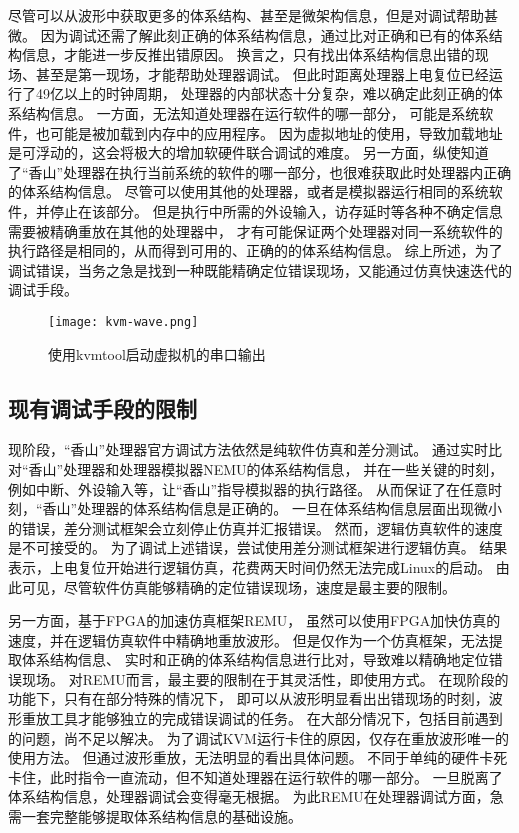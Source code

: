 尽管可以从波形中获取更多的体系结构、甚至是微架构信息，但是对调试帮助甚微。
因为调试还需了解此刻正确的体系结构信息，通过比对正确和已有的体系结构信息，才能进一步反推出错原因。
换言之，只有找出体系结构信息出错的现场、甚至是第一现场，才能帮助处理器调试。
但此时距离处理器上电复位已经运行了49亿以上的时钟周期，
处理器的内部状态十分复杂，难以确定此刻正确的体系结构信息。
一方面，无法知道处理器在运行软件的哪一部分，
可能是系统软件，也可能是被加载到内存中的应用程序。
因为虚拟地址的使用，导致加载地址是可浮动的，这会将极大的增加软硬件联合调试的难度。
另一方面，纵使知道了“香山”处理器在执行当前系统的软件的哪一部分，也很难获取此时处理器内正确的体系结构信息。
尽管可以使用其他的处理器，或者是模拟器运行相同的系统软件，并停止在该部分。
但是执行中所需的外设输入，访存延时等各种不确定信息需要被精确重放在其他的处理器中，
才有可能保证两个处理器对同一系统软件的执行路径是相同的，从而得到可用的、正确的的体系结构信息。
综上所述，为了调试错误，当务之急是找到一种既能精确定位错误现场，又能通过仿真快速迭代的调试手段。

\begin{figure}[htbp]
    \centering
    \texttt{[image: kvm-wave.png]}
    \caption{使用kvmtool启动虚拟机的串口输出}
    \label{fig:kvm-wave}
\end{figure}

\subsection{现有调试手段的限制}
现阶段，“香山”处理器官方调试方法依然是纯软件仿真和差分测试。
通过实时比对“香山”处理器和处理器模拟器NEMU的体系结构信息，
并在一些关键的时刻，例如中断、外设输入等，让“香山”指导模拟器的执行路径。
从而保证了在任意时刻，“香山”处理器的体系结构信息是正确的。
一旦在体系结构信息层面出现微小的错误，差分测试框架会立刻停止仿真并汇报错误。
然而，逻辑仿真软件的速度是不可接受的。
为了调试上述错误，尝试使用差分测试框架进行逻辑仿真。
结果表示，上电复位开始进行逻辑仿真，花费两天时间仍然无法完成Linux的启动。
由此可见，尽管软件仿真能够精确的定位错误现场，速度是最主要的限制。

另一方面，基于FPGA的加速仿真框架REMU，
虽然可以使用FPGA加快仿真的速度，并在逻辑仿真软件中精确地重放波形。
但是仅作为一个仿真框架，无法提取体系结构信息、
实时和正确的体系结构信息进行比对，导致难以精确地定位错误现场。
对REMU而言，最主要的限制在于其灵活性，即使用方式。
在现阶段的功能下，只有在部分特殊的情况下，
即可以从波形明显看出出错现场的时刻，波形重放工具才能够独立的完成错误调试的任务。
在大部分情况下，包括目前遇到的问题，尚不足以解决。
为了调试KVM运行卡住的原因，仅存在重放波形唯一的使用方法。
但通过波形重放，无法明显的看出具体问题。
不同于单纯的硬件卡死卡住，此时指令一直流动，但不知道处理器在运行软件的哪一部分。
一旦脱离了体系结构信息，处理器调试会变得毫无根据。
为此REMU在处理器调试方面，急需一套完整能够提取体系结构信息的基础设施。

